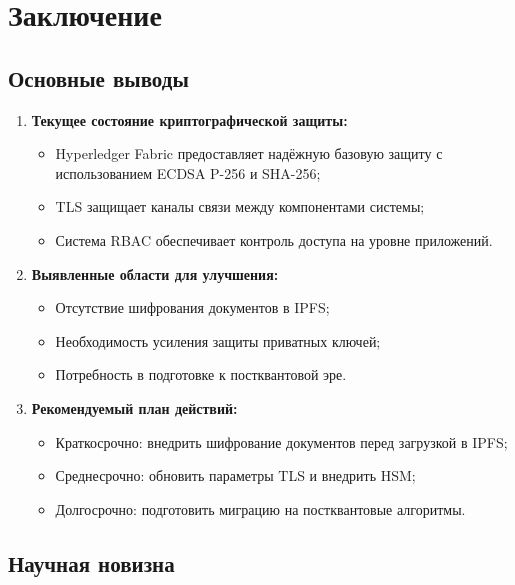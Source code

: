 \documentclass[a4paper,14pt]{extreport}
\begin{document}
\newpage

\chapter{Заключение}

\section{Основные выводы}

\begin{enumerate}
    \item \textbf{Текущее состояние криптографической защиты:}
    \begin{itemize}
        \item Hyperledger Fabric предоставляет надёжную базовую защиту с использованием ECDSA P-256 и SHA-256;
        \item TLS защищает каналы связи между компонентами системы;
        \item Система RBAC обеспечивает контроль доступа на уровне приложений.
    \end{itemize}
    
    \item \textbf{Выявленные области для улучшения:}
    \begin{itemize}
        \item Отсутствие шифрования документов в IPFS;
        \item Необходимость усиления защиты приватных ключей;
        \item Потребность в подготовке к постквантовой эре.
    \end{itemize}
    
    \item \textbf{Рекомендуемый план действий:}
    \begin{itemize}
        \item Краткосрочно: внедрить шифрование документов перед загрузкой в IPFS;
        \item Среднесрочно: обновить параметры TLS и внедрить HSM;
        \item Долгосрочно: подготовить миграцию на постквантовые алгоритмы.
    \end{itemize}
\end{enumerate}

\section{Научная новизна}
\end{document}
